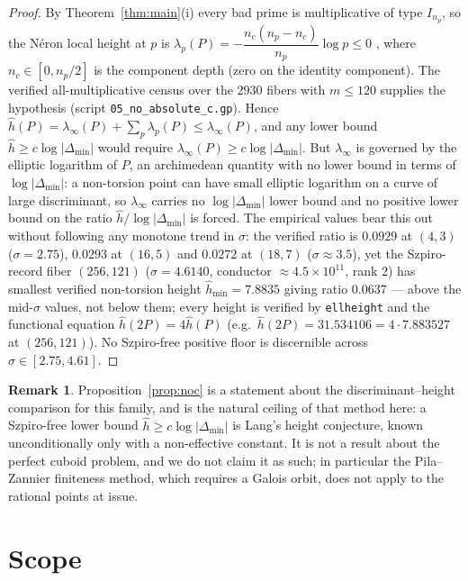 \documentclass[11pt,reqno]{amsart}
\theoremstyle{plain}
\theoremstyle{definition}
\newtheorem{remark}[theorem]{Remark}
\newcommand{\hath}{\hat{h}}
\begin{document}
\begin{proof}
By Theorem~\ref{thm:main}(i) every bad prime is multiplicative of type $I_{n_p}$,
so the N\'eron local height at $p$ is
$\lambda_p(P)=-\dfrac{n_c(n_p-n_c)}{n_p}\log p\le0$ \cite{silverman-atec}, where
$n_c\in[0,n_p/2]$ is the component depth (zero on the identity component). The
verified all-multiplicative census over the $2930$ fibers with $m\le120$ supplies
the hypothesis (script \texttt{05\_no\_absolute\_c.gp}). Hence $\hath(P)=\lambda_\infty(P)+\sum_p\lambda_p(P)
\le\lambda_\infty(P)$, and any lower bound $\hath\ge c\log|\Delta_{\min}|$ would
require $\lambda_\infty(P)\ge c\log|\Delta_{\min}|$. But $\lambda_\infty$ is governed
by the elliptic logarithm of $P$, an archimedean quantity with no lower bound in
terms of $\log|\Delta_{\min}|$: a non-torsion point can have small elliptic
logarithm on a curve of large discriminant, so $\lambda_\infty$ carries no
$\log|\Delta_{\min}|$ lower bound and no positive lower bound on the ratio
$\hath/\log|\Delta_{\min}|$ is forced. The empirical values bear this out without
following any monotone trend in $\sigma$: the verified ratio is $0.0929$ at $(4,3)$
($\sigma=2.75$), $0.0293$ at $(16,5)$ and $0.0272$ at $(18,7)$ ($\sigma\approx3.5$),
yet the Szpiro-record fiber $(256,121)$ ($\sigma=4.6140$, conductor
$\approx4.5\times10^{11}$, rank $2$) has smallest verified non-torsion height
$\hath_{\min}=7.8835$ giving ratio $0.0637$ --- above the mid-$\sigma$ values, not
below them; every height is verified by \texttt{ellheight} and the functional
equation $\hath(2P)=4\hath(P)$ (e.g.\ $\hath(2P)=31.534106=4\cdot7.883527$ at
$(256,121)$). No Szpiro-free positive floor is discernible across
$\sigma\in[2.75,4.61]$.
\end{proof}

\begin{remark}
Proposition~\ref{prop:noc} is a statement about the discriminant--height
comparison for this family, and is the natural ceiling of that method here: a
Szpiro-free lower bound $\hath\ge c\log|\Delta_{\min}|$ is Lang's height
conjecture, known unconditionally only with a non-effective constant. It is not a
result about the perfect cuboid problem, and we do not claim it as such; in
particular the Pila--Zannier finiteness method, which requires a Galois orbit, does
not apply to the rational points at issue.
\end{remark}

\section{Scope}
\end{document}
